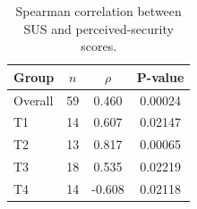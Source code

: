 \begin{table}[tbp]
\centering
\begin{tabular}{lccc}
\toprule
Group & $n$ & $\rho$ & P-value \\ \midrule
Overall & 59 & 0.460 & 0.00024 \\
T1 & 14 & 0.607 & 0.02147 \\
T2 & 13 & 0.817 & 0.00065 \\
T3 & 18 & 0.535 & 0.02219 \\
T4 & 14 & -0.608 & 0.02118 \\
\bottomrule
\end{tabular}
\caption{Spearman correlation between SUS and perceived-security scores.}
\label{tab:spearman}
\end{table}

